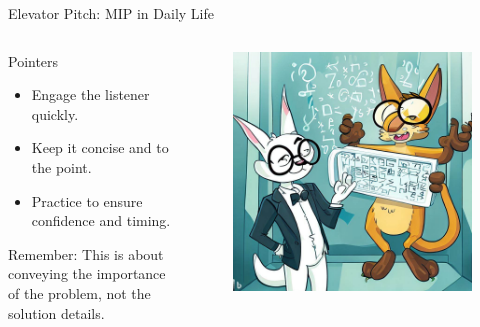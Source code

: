 \documentclass[
    NAME={Dr. Helga Ingimundardóttir},
    EMAIL={helgaingim@hi.is},
    FACULTY={Industrial Engineering},
    TITLE={Mixed Integer Programming},
    SUBTITLE={Techniques and Applications},
    SEMINAR={VÉL113F},
    DATE={Design and Optimization},
    WIDE=true
]{../HI-latex/hi-beamer}
\begin{document}
\begin{frame}{Elevator Pitch: MIP in Daily Life}
        \begin{columns}
            \begin{column}{.5\textwidth}
                \begin{block}{Pointers}
                    \begin{itemize}
                        \item Engage the listener quickly.
                        \item Keep it concise and to the point.
                        \item Practice to ensure confidence and timing.
                    \end{itemize}
                \end{block}
                \footnotesize{Remember: This is about conveying the importance of the problem, not the solution details.}
            \end{column}
            \begin{column}{.5\textwidth}
                \begin{figure}
                    \centering
                    \includegraphics[height=0.7\textheight]{figures/elevator-pitch.jpg}
                \end{figure}
            \end{column}
        \end{columns}
    \end{frame}
\end{document}
